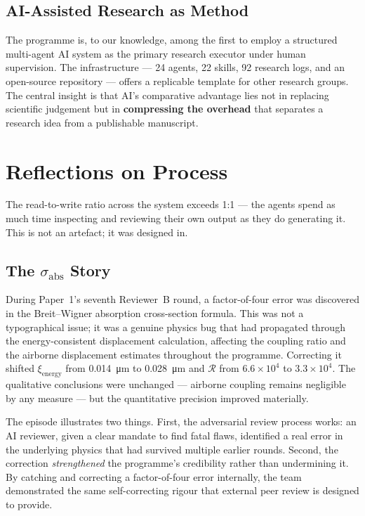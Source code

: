 \documentclass[11pt,a4paper]{article}
\begin{document}
\subsection{AI-Assisted Research as Method}

The programme is, to our knowledge, among the first to employ a structured multi-agent AI system as the primary research executor under human supervision. The infrastructure --- 24 agents, 22 skills, 92 research logs, and an open-source repository --- offers a replicable template for other research groups. The central insight is that AI's comparative advantage lies not in replacing scientific judgement but in \textbf{compressing the overhead} that separates a research idea from a publishable manuscript.

\section{Reflections on Process}

The read-to-write ratio across the system exceeds 1:1 --- the agents spend as much time inspecting and reviewing their own output as they do generating it. This is not an artefact; it was designed in.

\subsection{The $\sigma_\mathrm{abs}$ Story}

During Paper~1's seventh Reviewer~B round, a factor-of-four error was discovered in the Breit--Wigner absorption cross-section formula. This was not a typographical issue; it was a genuine physics bug that had propagated through the energy-consistent displacement calculation, affecting the coupling ratio and the airborne displacement estimates throughout the programme. Correcting it shifted $\xi_\mathrm{energy}$ from \SI{0.014}{\micro\m} to \SI{0.028}{\micro\m} and $\mathcal{R}$ from $6.6 \times 10^4$ to $3.3 \times 10^4$. The qualitative conclusions were unchanged --- airborne coupling remains negligible by any measure --- but the quantitative precision improved materially.

The episode illustrates two things. First, the adversarial review process works: an AI reviewer, given a clear mandate to find fatal flaws, identified a real error in the underlying physics that had survived multiple earlier rounds. Second, the correction \emph{strengthened} the programme's credibility rather than undermining it. By catching and correcting a factor-of-four error internally, the team demonstrated the same self-correcting rigour that external peer review is designed to provide.
\end{document}
